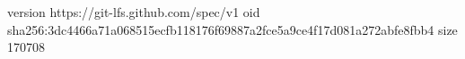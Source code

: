 version https://git-lfs.github.com/spec/v1
oid sha256:3dc4466a71a068515ecfb118176f69887a2fce5a9ce4f17d081a272abfe8fbb4
size 170708
